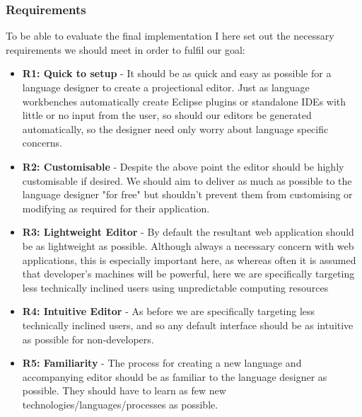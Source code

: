 \documentclass{article}
\begin{document}
\subsubsection{Requirements}\label{requirements}
To be able to evaluate the final implementation I here set out the necessary requirements we should meet in order to fulfil our goal: 

\begin{itemize}
\item{\textbf{R1: Quick to setup} - It should be as quick and easy as possible for a language designer to create a projectional editor. Just as language workbenches automatically create Eclipse plugins or standalone IDEs with little or no input from the user, so should our editors be generated automatically, so the designer need only worry about language specific concerns.}
\item{\textbf{R2: Customisable} - Despite the above point the editor should be highly customisable if desired. We should aim to deliver as much as possible to the language designer "for free" but shouldn't prevent them from customising or modifying as required for their application. }
\item{\textbf{R3: Lightweight Editor} - By default the resultant web application should be as lightweight as possible. Although always a necessary concern with web applications, this is especially important here, as whereas often it is assumed that developer's machines will be powerful, here we are specifically targeting less technically inclined users using unpredictable computing resources}
\item{\textbf{R4: Intuitive Editor} - As before we are specifically targeting less technically inclined users, and so any default interface should be as intuitive as possible for non-developers.}
\item{\textbf{R5: Familiarity} - The process for creating a new language and accompanying editor should be as familiar to the language designer as possible. They should have to learn as few new technologies/languages/processes as possible.}
\end{itemize}
\end{document}
